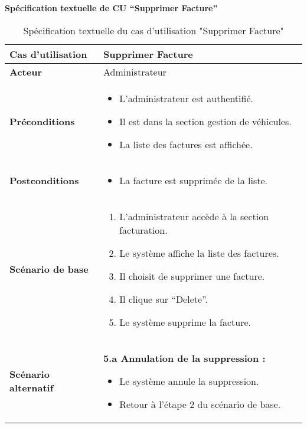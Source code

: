 \documentclass[a4paper,11pt]{report}
\begin{document}
\textbf{Spécification textuelle de CU “Supprimer Facture”}

\begin{table}[H]
  \centering
  \renewcommand{\arraystretch}{1.5}
  \caption{Spécification textuelle du cas d'utilisation "Supprimer Facture"}
  \begin{tabularx}{\textwidth}{|l|X|}
    \hline
    \textbf{Cas d'utilisation} & Supprimer Facture \\ \hline
    \textbf{Acteur}            & Administrateur \\ \hline
    \textbf{Préconditions}     & 
      \begin{itemize}
        \item L’administrateur est authentifié.
        \item Il est dans la section gestion de véhicules.
        \item La liste des factures est affichée.
      \end{itemize} \\ \hline
    \textbf{Postconditions}    & 
      \begin{itemize}
        \item La facture est supprimée de la liste.
      \end{itemize} \\ \hline
    \textbf{Scénario de base}  & 
      \begin{enumerate}
        \item L’administrateur accède à la section facturation.
        \item Le système affiche la liste des factures.
        \item Il choisit de supprimer une facture.
        \item Il clique sur “Delete”.
        \item Le système supprime la facture.
      \end{enumerate} \\ \hline
    \textbf{Scénario alternatif} & 
      \textbf{5.a Annulation de la suppression :}
      \begin{itemize}
        \item Le système annule la suppression.
        \item Retour à l’étape 2 du scénario de base.
      \end{itemize} \\ \hline
  \end{tabularx}
\end{table}
\end{document}
